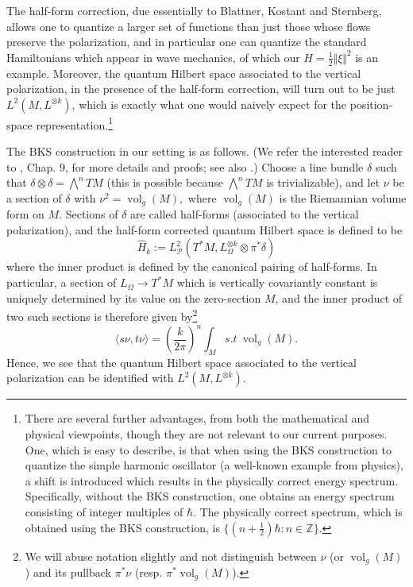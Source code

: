\documentclass[12pt,leqno]{amsart}%
\theoremstyle{definition}
\theoremstyle{remark}
\numberwithin{equation}{section}
\def\vol{\operatorname{vol}}
\begin{document}
The half-form correction, due essentially to Blattner, Kostant and Sternberg,
allows one
to quantize a larger set of functions than just those whose flows preserve the
polarization, and in particular one can quantize the standard Hamiltonians which
appear in wave mechanics, of which our $H=\frac{1}{2}\Vert\xi\Vert^{2}$ is an
example. Moreover, the quantum Hilbert space associated to the vertical
polarization, in the presence of the half-form correction, will turn out to be
just $L^2(M,L^{\otimes k})$, which is exactly what one would naively expect for
the position-space representation.\footnote{There are several further
advantages, from both
the mathematical and physical viewpoints, though they are not relevant to our
current purposes. One, which is easy to describe, is that when using the BKS
construction to quantize the simple harmonic oscillator (a well-known example
from physics), a shift is introduced which results in the physically correct
energy spectrum. Specifically, without the BKS construction, one obtains an
energy spectrum consisting of integer multiples of $\hbar.$ The physically
correct spectrum, which is obtained using the BKS construction, is
$\{(n+\frac{1}{2})\hbar:n\in\mathbb{Z\}}$.}

The BKS construction in our setting is as follows. (We refer the interested
reader to \cite{Woo}, Chap. 9, for more details and proofs; see also \cite{GS}.)
Choose a line
bundle $\delta$ such that $\delta\otimes\delta=\bigwedge^{n}TM$ (this is
possible because $\bigwedge^{n}TM$ is trivializable), and let $\nu$ be a section
of $\delta$ with $\nu^{2}=\vol_g(M),$ where $\vol_g(M)$ is the Riemannian volume
form on
$M$. Sections of $\delta$ are called half-forms (associated to the vertical
polarization), and the half-form corrected
quantum Hilbert space is defined to be
\[
\widehat{H}_k:=L^{2}_{\mathcal{P}}(T^*M,L_\Omega^{\otimes k}\otimes\pi^*\delta)
\]
where the inner product is defined by the canonical pairing of half-forms. In
particular, a section of $L_\Omega\rightarrow T^*M$ which is vertically
covariantly constant is uniquely determined by its value on the zero-section
$M$, and the inner product of two such sections is therefore given
by\footnote{We will abuse notation slightly and not distinguish between $\nu$
(or
$\vol_g(M)$) and its pullback $\pi^{\ast}\nu$ (resp. $\pi^{\ast}\vol_g(M)$).}
\begin{equation}
\langle s\nu,t\nu\rangle = \left(\frac{k}{2\pi}\right)^n\int_M s.t\ \vol_g(M).
\label{eqn:half-form-pairing}
\end{equation}
Hence, we see that the quantum Hilbert space associated to the vertical
polarization can be identified with $L^2(M,L^{\otimes k}).$
\end{document}
